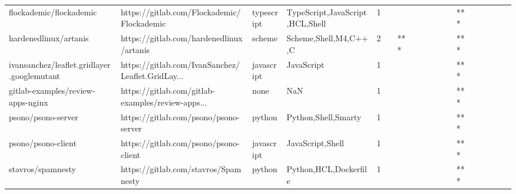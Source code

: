 \begin{tabular}{llllrlllllllllllll}
flockademic/flockademic                            &         https://gitlab.com/Flockademic/Flockademic &        typescript &                    TypeScript,JavaScript,HCL,Shell &       1 &         &        &           &                &                 &        &           &       *** &          &          &       &              &          \\
hardenedlinux/artanis                              &           https://gitlab.com/hardenedlinux/artanis &            scheme &                              Scheme,Shell,M4,C++,C &       2 &         &    *** &           &                &                 &        &           &       *** &          &          &       &              &          \\
ivansanchez/leaflet.gridlayer.googlemutant         &  https://gitlab.com/IvanSanchez/Leaflet.GridLay... &        javascript &                                         JavaScript &       1 &         &        &           &                &                 &        &           &       *** &          &          &       &              &          \\
gitlab-examples/review-apps-nginx                  &  https://gitlab.com/gitlab-examples/review-apps... &              none &                                                NaN &       1 &         &        &           &                &                 &        &           &       *** &          &          &       &              &          \\
psono/psono-server                                 &              https://gitlab.com/psono/psono-server &            python &                                Python,Shell,Smarty &       1 &         &        &           &                &                 &        &           &       *** &          &          &       &              &          \\
psono/psono-client                                 &              https://gitlab.com/psono/psono-client &        javascript &                                   JavaScript,Shell &       1 &         &        &           &                &                 &        &           &       *** &          &          &       &              &          \\
stavros/spamnesty                                  &               https://gitlab.com/stavros/Spamnesty &            python &                              Python,HCL,Dockerfile &       1 &         &        &           &                &                 &        &           &       *** &          &          &       &              &          \\

\end{tabular}
